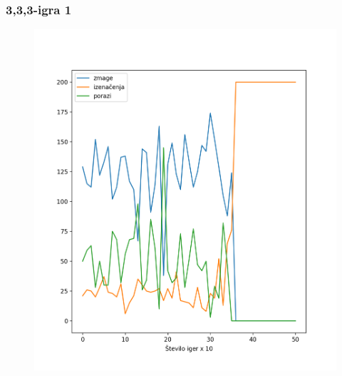 \documentclass{beamer}    %
\begin{document}
\begin{frame}
    \frametitle{3,3,3-igra 1}
    \begin{figure}
        \includegraphics[scale=0.4]{slike/ag-ag_500_200_10.png}
    \end{figure}
\end{frame}
\end{document}
